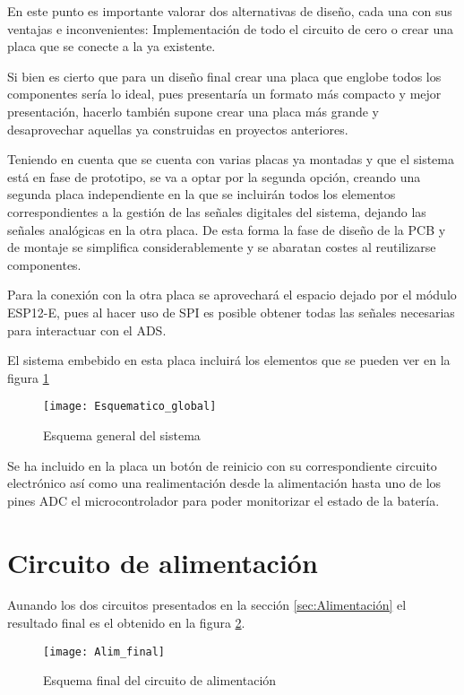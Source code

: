 En este punto es importante valorar dos alternativas de diseño, cada una con sus ventajas e inconvenientes: Implementación de todo el circuito de cero o crear una placa que se conecte a la ya existente.

Si bien es cierto que para un diseño final crear una placa que englobe todos los componentes sería lo ideal, pues presentaría un formato más compacto y mejor presentación, hacerlo también supone crear una placa más grande y desaprovechar aquellas ya construidas en proyectos anteriores.

Teniendo en cuenta que se cuenta con varias placas ya montadas y que el sistema está en fase de prototipo, se va a optar por la segunda opción, creando una segunda placa independiente en la que se incluirán todos los elementos correspondientes a la gestión de las señales digitales del sistema, dejando las señales analógicas en la otra placa. De esta forma la fase de diseño de la \acrshort{PCB} y de montaje se simplifica considerablemente y se abaratan costes al reutilizarse componentes.

Para la conexión con la otra placa se aprovechará el espacio dejado por el módulo ESP12-E, pues al hacer uso de \acrshort{SPI} es posible obtener todas las señales necesarias para interactuar con el ADS.

El sistema embebido en esta placa incluirá los elementos que se pueden ver en la figura \ref{fig:Esquematico_global}

\begin{figure} [h]
    \centering
    \texttt{[image: Esquematico\_global]}
    \caption{Esquema general del sistema}
    \label{fig:Esquematico_global}
\end{figure}

Se ha incluido en la placa un botón de reinicio con su correspondiente circuito electrónico así como una realimentación desde la alimentación hasta uno de los pines \acrshort{ADC} el microcontrolador para poder monitorizar el estado de la batería.

\section{Circuito de alimentación\label{sec:Esquemáticos_alim}}

Aunando los dos circuitos presentados en la sección \ref{sec:Alimentación} el resultado final es el obtenido en la figura \ref{fig:Alim_final}.

\begin{figure} [h]
    \centering
    \texttt{[image: Alim\_final]}
    \caption{Esquema final del circuito de alimentación}
    \label{fig:Alim_final}
\end{figure}

